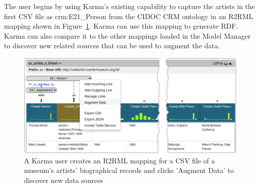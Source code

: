 The user begins by using Karma's existing capability to capture the artists in the first CSV file as crm:E21\_Person from the CIDOC CRM ontology in an R2RML mapping shown in Figure~\ref{fig:simple-model-screenshot}.  
Karma can use this mapping to generate RDF. 
Karma can also compare it to the other mappings loaded in the Model Manager to discover new related sources that can be used to augment the data.
\begin{figure}[t]
\centering
\includegraphics[width=4.8in]{images/4-simple-model.png}
\vspace{-20pt}
\caption{A Karma user creates an R2RML mapping for a CSV file of a museum's artists' biographical records and clicks 'Augment Data' to discover new data sources}
\vspace{-21pt}
\label{fig:simple-model-screenshot}
\end{figure}
